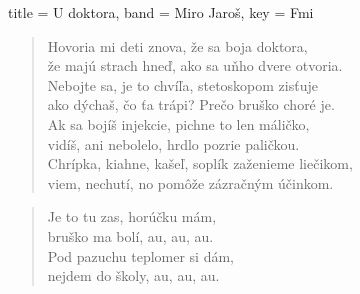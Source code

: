 \begin{song}[
    remember-chords = true ,
    verse/numbered = true ,
    transpose-capo = true 
  ]{
    title = U doktora,
    band = Miro Jaroš,
    key  = Fmi
  }
	\begin{verse}
	Hovoria mi deti znova, že sa boja doktora, \\
	že majú strach hneď, ako sa uňho dvere otvoria. \\
	Nebojte sa, je to chvíľa, stetoskopom zisťuje \\
	ako dýchaš, čo ťa trápi? Prečo bruško choré je. \\
	Ak sa bojíš injekcie, pichne to len máličko, \\
	vidíš, ani nebolelo, hrdlo pozrie paličkou. \\ 
	Chrípka, kiahne, kašeľ, soplík zaženieme liečikom, \\ 
	viem, nechutí, no pomôže zázračným účinkom.
  	\end{verse}
  	
  	\begin{verse}
  	Je to tu zas, horúčku mám, \\ 
  	bruško ma bolí, au, au, au.\\ 
  	Pod pazuchu teplomer si dám, \\ 
  	nejdem do školy, au, au, au.
  	\end{verse}
  	
  	\begin{chorus}
  	\end{chorus}
  	
\end{song}